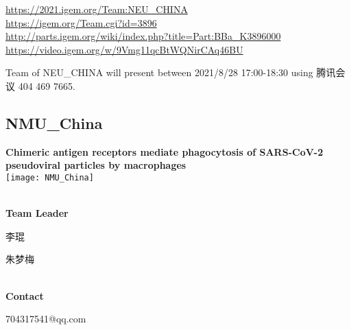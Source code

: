 \url{https://2021.igem.org/Team:NEU\_CHINA }\\
\url{https://igem.org/Team.cgi?id=3896 }\\
\url{http://parts.igem.org/wiki/index.php?title=Part:BBa_K3896000 }\\
\url{https://video.igem.org/w/9Vmg11qcBtWQNirCAq46BU }\\

\vfill{}









Team of NEU\_CHINA will present between        2021/8/28 17:00-18:30 using 腾讯会议 404 469 7665.
\newpage


\subsection{\textcolor{Blu}{ NMU\_China } }
\vspace{5mm}
\begin{center}
\large{
  \textbf{ Chimeric antigen receptors mediate phagocytosis of SARS-CoV-2 pseudoviral particles by macrophages }\\
  \texttt{[image: NMU\_China]}
}
\end{center}
\textbf{\\Team Leader}

  李琨

  朱梦梅


\textbf{\\Contact}

  704317541@qq.com


